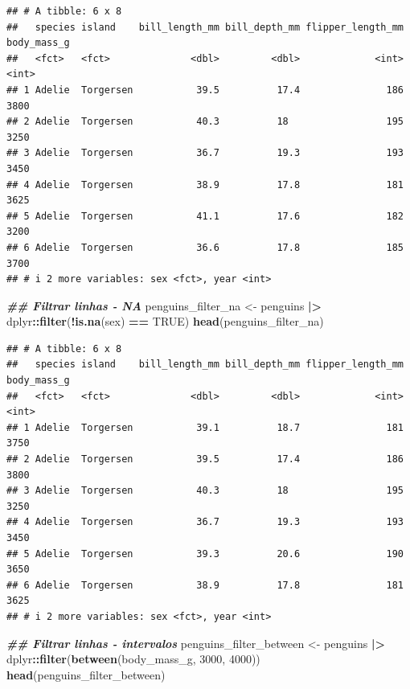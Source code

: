 \documentclass[
]{article}
\newenvironment{Shaded}{\begin{snugshade}}{\end{snugshade}}
\newcommand{\ConstantTok}[1]{\textcolor[rgb]{0.56,0.35,0.01}{#1}}
\newcommand{\DecValTok}[1]{\textcolor[rgb]{0.00,0.00,0.81}{#1}}
\newcommand{\DocumentationTok}[1]{\textcolor[rgb]{0.56,0.35,0.01}{\textbf{\textit{#1}}}}
\newcommand{\FunctionTok}[1]{\textcolor[rgb]{0.13,0.29,0.53}{\textbf{#1}}}
\newcommand{\NormalTok}[1]{#1}
\newcommand{\OtherTok}[1]{\textcolor[rgb]{0.56,0.35,0.01}{#1}}
\newcommand{\SpecialCharTok}[1]{\textcolor[rgb]{0.81,0.36,0.00}{\textbf{#1}}}
\begin{document}
\begin{verbatim}
## # A tibble: 6 x 8
##   species island    bill_length_mm bill_depth_mm flipper_length_mm body_mass_g
##   <fct>   <fct>              <dbl>         <dbl>             <int>       <int>
## 1 Adelie  Torgersen           39.5          17.4               186        3800
## 2 Adelie  Torgersen           40.3          18                 195        3250
## 3 Adelie  Torgersen           36.7          19.3               193        3450
## 4 Adelie  Torgersen           38.9          17.8               181        3625
## 5 Adelie  Torgersen           41.1          17.6               182        3200
## 6 Adelie  Torgersen           36.6          17.8               185        3700
## # i 2 more variables: sex <fct>, year <int>
\end{verbatim}

\begin{Shaded}
\begin{Highlighting}[]
\DocumentationTok{\#\# Filtrar linhas {-} NA}
\NormalTok{penguins\_filter\_na }\OtherTok{\textless{}{-}}\NormalTok{ penguins }\SpecialCharTok{|\textgreater{}} 
\NormalTok{    dplyr}\SpecialCharTok{::}\FunctionTok{filter}\NormalTok{(}\SpecialCharTok{!}\FunctionTok{is.na}\NormalTok{(sex) }\SpecialCharTok{==} \ConstantTok{TRUE}\NormalTok{)}
\FunctionTok{head}\NormalTok{(penguins\_filter\_na)}
\end{Highlighting}
\end{Shaded}

\begin{verbatim}
## # A tibble: 6 x 8
##   species island    bill_length_mm bill_depth_mm flipper_length_mm body_mass_g
##   <fct>   <fct>              <dbl>         <dbl>             <int>       <int>
## 1 Adelie  Torgersen           39.1          18.7               181        3750
## 2 Adelie  Torgersen           39.5          17.4               186        3800
## 3 Adelie  Torgersen           40.3          18                 195        3250
## 4 Adelie  Torgersen           36.7          19.3               193        3450
## 5 Adelie  Torgersen           39.3          20.6               190        3650
## 6 Adelie  Torgersen           38.9          17.8               181        3625
## # i 2 more variables: sex <fct>, year <int>
\end{verbatim}

\begin{Shaded}
\begin{Highlighting}[]
\DocumentationTok{\#\# Filtrar linhas {-} intervalos}
\NormalTok{penguins\_filter\_between }\OtherTok{\textless{}{-}}\NormalTok{ penguins }\SpecialCharTok{|\textgreater{}} 
\NormalTok{    dplyr}\SpecialCharTok{::}\FunctionTok{filter}\NormalTok{(}\FunctionTok{between}\NormalTok{(body\_mass\_g, }\DecValTok{3000}\NormalTok{, }\DecValTok{4000}\NormalTok{))}
\FunctionTok{head}\NormalTok{(penguins\_filter\_between)}
\end{Highlighting}
\end{Shaded}
\end{document}
